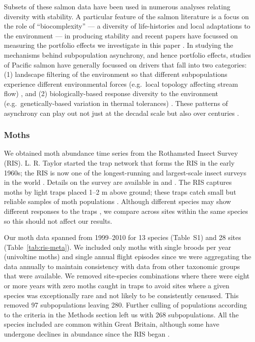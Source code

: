 Subsets of these salmon data have been used in numerous analyses relating
diversity with stability. A particular feature of the salmon literature is a
focus on the role of ``biocomplexity'' --- a diversity of life-histories and
local adaptations to the environment --- in producing stability
\citep{hilborn2003} and recent papers have focussed on measuring the
portfolio effects we investigate in this paper \citep{schindler2010,
  carlson2011}. In studying the mechanisms behind subpopulation
asynchrony, and hence portfolio effects, studies of Pacific salmon have
generally focussed on drivers that fall into two categories: (1) landscape
filtering of the environment so that different subpopulations experience
different environmental forces (e.g.\ local topology affecting stream flow)
\citep[e.g.][]{schindler2008}, and (2) biologically-based response
diversity to the environment (e.g.\ genetically-based variation in thermal
tolerances) \citep[e.g.][]{eliason2011}. These patterns of asynchrony can
play out not just at the decadal scale but also over centuries
\citep{rogers2013}.

\subsubsection{Moths}
We obtained moth abundance time series from the Rothamsted Insect Survey
(RIS). L. R. Taylor started the trap network that forms the RIS in the early
1960s; the RIS is now one of the longest-running and largest-scale insect
surveys in the world \citep{conrad2004}. Details on the survey are
available in \citet{conrad2004} and \citet{taylor1986}. The RIS
captures moths by light traps \citep{williams1948} placed 1--2 m above
ground; these traps catch small but reliable samples of moth populations
\citep{williams1948, taylor1974, conrad2004}. Although
different species may show different responses to the traps
\citep{Muirhead-thomson1991, woiwod1992}, we compare across sites
within the same species so this should not affect our results.

Our moth data spanned from 1999--2010 for 13 species (Table~S1) and 28 sites
(Table~\ref{tab:ris-meta}). We included only moths with single broods per year
(univoltine moths) and single annual flight episodes since we were aggregating
the data annually to maintain consistency with data from other taxonomic
groups that were available. We removed site-species combinations where there
were eight or more years with zero moths caught in traps to avoid sites where
a given species was exceptionally rare and not likely to be consistently
censused. This removed 97 subpopulations leaving 280. Further culling of
populations according to the criteria in the Methods section left us with 268
subpopulations. All the species included are common within Great Britain,
although some have undergone declines in abundance since the RIS began
\citep{conrad2004}.

